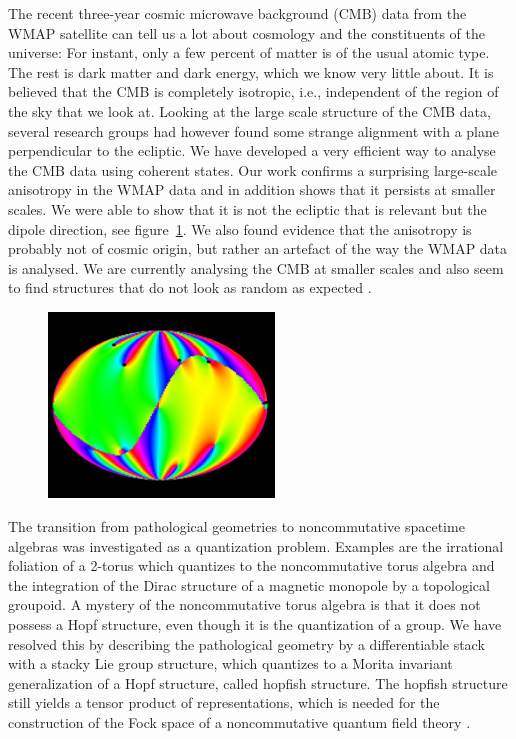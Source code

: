 The recent three-year cosmic microwave background (CMB) data from
the WMAP satellite can tell us a lot about cosmology and the
constituents of the universe: For instant, only a few percent of
matter is of the usual atomic type. The rest is dark matter and dark
energy, which we know very little about. It is believed that the CMB
is completely isotropic, i.e., independent of the region of the sky
that we look at. Looking at the large scale structure of the CMB
data, several research groups had however found some strange
alignment with a plane perpendicular to the ecliptic. We have
developed a very efficient way to analyse the CMB data using
coherent states. Our work confirms a surprising large-scale
anisotropy in the WMAP data and in addition shows that it persists
at smaller scales. We were able to show that it is not the ecliptic
that is relevant but the dipole direction, see
figure~\ref{fig:schupp}. We also found evidence that the anisotropy
is probably not of cosmic origin, but rather an artefact of the way
the WMAP data is analysed. We are currently analysing the CMB at
smaller scales and also seem to find structures that do not look as
random as expected \cite{Helling:2006xh}.
\begin{figure}[ht]
  \begin{center}
    \includegraphics[width=6cm]{Schupp/schupp-fig.png}
    \label{fig:schupp}
   \end{center}
\end{figure}


 The transition
from pathological geometries to noncommutative spacetime algebras
was investigated as a quantization problem. Examples are the
irrational foliation of a 2-torus which quantizes to the
noncommutative torus algebra and the integration of the Dirac
structure of a magnetic monopole by a topological groupoid. A
mystery of the noncommutative torus algebra is that it does not
possess a Hopf structure, even though it is the quantization of a
group. We have resolved this by describing the pathological geometry
by a differentiable stack with a stacky Lie group structure, which
quantizes to a Morita invariant generalization of a Hopf structure,
called hopfish structure. The hopfish structure still yields a
tensor product of representations, which is needed for the
construction of the Fock space of a noncommutative quantum field
theory \cite{Blohmann:2006uj}.



